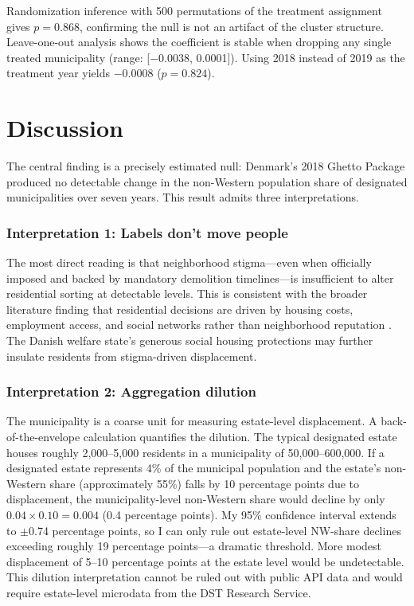 \documentclass[12pt]{article}
\begin{document}
Randomization inference with 500 permutations of the treatment assignment gives $p=0.868$, confirming the null is not an artifact of the cluster structure. Leave-one-out analysis shows the coefficient is stable when dropping any single treated municipality (range: [$-$0.0038, 0.0001]). Using 2018 instead of 2019 as the treatment year yields $-$0.0008 ($p=0.824$).

\section{Discussion}
\label{sec:discussion}

The central finding is a precisely estimated null: Denmark's 2018 Ghetto Package produced no detectable change in the non-Western population share of designated municipalities over seven years. This result admits three interpretations.

\subsubsection*{Interpretation 1: Labels don't move people} The most direct reading is that neighborhood stigma---even when officially imposed and backed by mandatory demolition timelines---is insufficient to alter residential sorting at detectable levels. This is consistent with the broader literature finding that residential decisions are driven by housing costs, employment access, and social networks rather than neighborhood reputation \citep{krysan2017cycle}. The Danish welfare state's generous social housing protections may further insulate residents from stigma-driven displacement.

\subsubsection*{Interpretation 2: Aggregation dilution} The municipality is a coarse unit for measuring estate-level displacement. A back-of-the-envelope calculation quantifies the dilution. The typical designated estate houses roughly 2,000--5,000 residents in a municipality of 50,000--600,000. If a designated estate represents 4\% of the municipal population and the estate's non-Western share (approximately 55\%) falls by 10 percentage points due to displacement, the municipality-level non-Western share would decline by only $0.04 \times 0.10 = 0.004$ (0.4 percentage points). My 95\% confidence interval extends to $\pm$0.74 percentage points, so I can only rule out estate-level NW-share declines exceeding roughly 19 percentage points---a dramatic threshold. More modest displacement of 5--10 percentage points at the estate level would be undetectable. This dilution interpretation cannot be ruled out with public API data and would require estate-level microdata from the DST Research Service.
\end{document}
